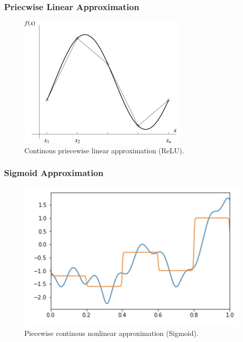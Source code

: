 \documentclass{beamer}
\begin{document}
\begin{frame}
    \frametitle{Priecwise Linear Approximation}
    \begin{figure}
        \includegraphics[width=\linewidth]{cpwl_approx_1.jpg}
        \caption{Continous priecewise linear approximation (ReLU).}
        \label{fig:cpwlapp}
    \end{figure}
\end{frame}

\begin{frame}
    \frametitle{Sigmoid Approximation}
    \begin{figure}
        \includegraphics[width=\linewidth]{sig_approx_1.jpeg}
        \caption{Piecewise continous nonlinear approximation (Sigmoid).}
        \label{fig:sigapp}
    \end{figure}
\end{frame}
\end{document}
